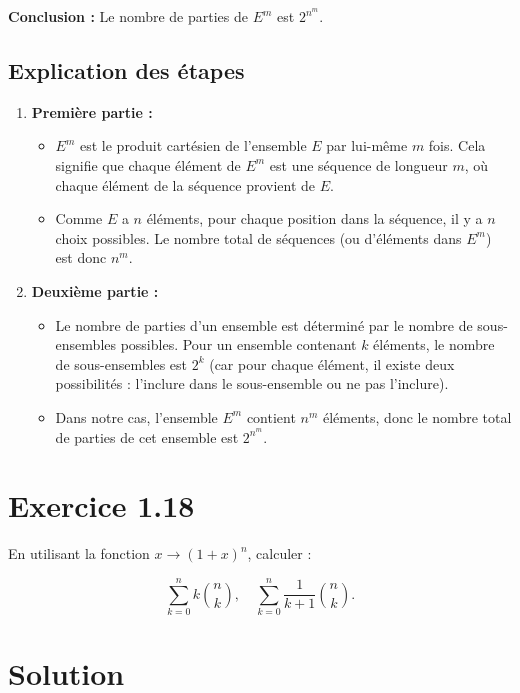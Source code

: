 \documentclass[a4paper,oneside,12pt]{amsbook}
\theoremstyle{definition}
\theoremstyle{remark}
\begin{document}
\textbf{Conclusion :} Le nombre de parties de \( E^m \) est \( 2^{n^m} \).

\subsection*{Explication des étapes}

\begin{enumerate}
    \item \textbf{Première partie :}
    \begin{itemize}
        \item \( E^m \) est le produit cartésien de l’ensemble \( E \) par lui-même \( m \) fois. Cela signifie que chaque élément de \( E^m \) est une séquence de longueur \( m \), où chaque élément de la séquence provient de \( E \).
        \item Comme \( E \) a \( n \) éléments, pour chaque position dans la séquence, il y a \( n \) choix possibles. Le nombre total de séquences (ou d’éléments dans \( E^m \)) est donc \( n^m \).
    \end{itemize}
    
    \item \textbf{Deuxième partie :}
    \begin{itemize}
        \item Le nombre de parties d’un ensemble est déterminé par le nombre de sous-ensembles possibles. Pour un ensemble contenant \( k \) éléments, le nombre de sous-ensembles est \( 2^k \) (car pour chaque élément, il existe deux possibilités : l’inclure dans le sous-ensemble ou ne pas l’inclure).
        \item Dans notre cas, l’ensemble \( E^m \) contient \( n^m \) éléments, donc le nombre total de parties de cet ensemble est \( 2^{n^m} \).
    \end{itemize}
\end{enumerate}




\section*{Exercice 1.18}
En utilisant la fonction $x \to (1 + x)^n$, calculer :

\[
\sum_{k=0}^n k \binom{n}{k}, \quad \sum_{k=0}^n \frac{1}{k+1}\binom{n}{k}.
\]

\section*{Solution}
\end{document}
